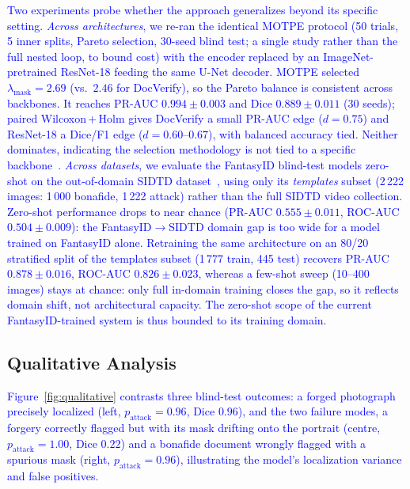 \documentclass[final,5p,times,twocolumn,number]{elsarticle}
\newcommand{\rev}[1]{\textcolor{blue}{#1}}
\begin{document}
\rev{Two experiments probe whether the approach generalizes beyond its specific
setting. \emph{Across architectures}, we re-ran the identical MOTPE protocol
(50 trials, 5 inner splits, Pareto selection, 30-seed blind test; a single study
rather than the full nested loop, to bound cost) with the encoder replaced by an
ImageNet-pretrained ResNet-18 feeding the same U-Net decoder. MOTPE selected
$\lambda_{\text{mask}} = 2.69$ (vs.\ $2.46$ for DocVerify), so the Pareto balance
is consistent across backbones. It reaches PR-AUC $0.994 \pm 0.003$ and Dice
$0.889 \pm 0.011$ (30 seeds); paired Wilcoxon\,+\,Holm gives DocVerify a small
PR-AUC edge ($d = 0.75$) and ResNet-18 a Dice/F1 edge ($d = 0.60$--$0.67$), with
balanced accuracy tied. Neither dominates, indicating the selection methodology
is not tied to a specific backbone~\citep{docverify_zenodo}. \emph{Across datasets},
we evaluate the FantasyID blind-test models zero-shot on the out-of-domain SIDTD
dataset~\citep{sidtd2024}, using only its \emph{templates} subset (2\,222 images:
1\,000 bonafide, 1\,222 attack) rather than the full SIDTD video collection.
Zero-shot performance drops to near chance (PR-AUC $0.555 \pm 0.011$, ROC-AUC
$0.504 \pm 0.009$): the FantasyID$\rightarrow$SIDTD domain gap is too wide for a
model trained on FantasyID alone. Retraining the same architecture on an 80/20
stratified split of the templates subset (1\,777 train, 445 test) recovers PR-AUC
$0.878 \pm 0.016$, ROC-AUC $0.826 \pm 0.023$, whereas a few-shot sweep
(10--400 images) stays at chance: only full in-domain training closes the gap, so
it reflects domain shift, not architectural capacity. The zero-shot scope of the
current FantasyID-trained system is thus bounded to its training domain.}

\subsection{Qualitative Analysis}
\label{subsec:qualitative}

\rev{Figure~\ref{fig:qualitative} contrasts three blind-test outcomes: a forged
photograph precisely localized (left, $p_{\text{attack}}=0.96$, Dice $0.96$), and
the two failure modes, a forgery correctly flagged but with its mask drifting onto
the portrait (centre, $p_{\text{attack}}=1.00$, Dice $0.22$) and a bonafide
document wrongly flagged with a spurious mask (right, $p_{\text{attack}}=0.96$),
illustrating the model's localization variance and false positives.}

\end{document}
